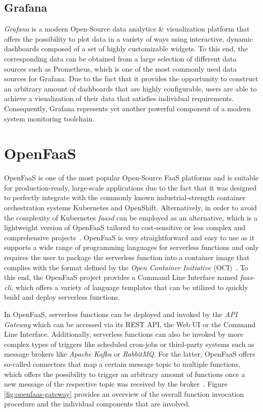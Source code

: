 \subsection{Grafana}
\textit{Grafana} is a modern Open-Source data analytics \& visualization platform that offers the possibility to plot data in a variety of ways using interactive, dynamic dashboards composed of a set of highly customizable widgets. To this end, the corresponding data can be obtained from a large selection of different data sources such as Prometheus, which is one of the most commonly used data sources for Grafana. Due to the fact that it provides the opportunity to construct an arbitrary amount of dashboards that are highly configurable, users are able to achieve a visualization of their data that satisfies individual requirements. Consequently, Grafana represents yet another powerful component of a modern system monitoring toolchain.

\section{OpenFaaS}
OpenFaaS is one of the most popular Open-Source FaaS platforms and is suitable for production-ready, large-scale applications due to the fact that it was designed to perfectly integrate with the commonly known industrial-strength container orchestration systems Kubernetes and OpenShift. Alternatively, in order to avoid the complexity of Kubernetes \textit{faasd} can be employed as an alternative, which is a lightweight version of OpenFaaS tailored to cost-sensitive or less complex and comprehensive projects~\parencite{openfaas-deployment}. OpenFaaS is very straightforward and easy to use as it supports a wide range of programming languages for serverless functions and only requires the user to package the serverless function into a container image that complies with the format defined by the \textit{Open Container Initiative} (OCI)~\parencite{openfaas-intro}. To this end, the OpenFaaS project provides a Command Line Interface named \textit{faas-cli}, which offers a variety of language templates that can be utilized to quickly build and deploy serverless functions. 

In OpenFaaS, serverless functions can be deployed and invoked by the \textit{API Gateway} which can be accessed via its REST API, the Web UI or the Command Line Interface. Additionally, serverless functions can also be invoked by more complex types of triggers like scheduled cron-jobs or third-party systems such as message brokers like \textit{Apache Kafka} or \textit{RabbitMQ}. For the latter, OpenFaaS offers so-called connectors that map a certain message topic to multiple functions, which offers the possibility to trigger an arbitrary amount of functions once a new message of the respective topic was received by the broker~\parencite{openfaas-triggers}. Figure \ref{fig:openfaas-gateway} provides an overview of the overall function invocation procedure and the individual components that are involved.

